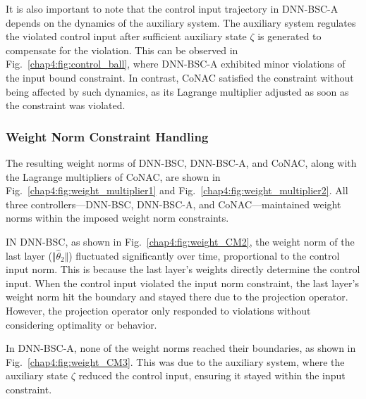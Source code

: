 It is also important to note that the control input trajectory in DNN-BSC-A depends on the dynamics of the auxiliary system. The auxiliary system regulates the violated control input after sufficient auxiliary state $\zeta$ is generated to compensate for the violation. This can be observed in Fig.~\ref{chap4:fig:control_ball}, where DNN-BSC-A exhibited minor violations of the input bound constraint. In contrast, CoNAC satisfied the constraint without being affected by such dynamics, as its Lagrange multiplier adjusted as soon as the constraint was violated.

\subsubsection{Weight Norm Constraint Handling}

The resulting weight norms of DNN-BSC, DNN-BSC-A, and CoNAC, along with the Lagrange multipliers of CoNAC, are shown in Fig.~\ref{chap4:fig:weight_multiplier1} and Fig.~\ref{chap4:fig:weight_multiplier2}. All three controllers—DNN-BSC, DNN-BSC-A, and CoNAC—maintained weight norms within the imposed weight norm constraints.

IN DNN-BSC, as shown in Fig.~\ref{chap4:fig:weight_CM2}, the weight norm of the last layer (\ie $\Vert {{{\hat \theta }_2}} \Vert$) fluctuated significantly over time, proportional to the control input norm. This is because the last layer’s weights directly determine the control input. When the control input violated the input norm constraint, the last layer’s weight norm hit the boundary and stayed there due to the projection operator. However, the projection operator only responded to violations without considering optimality or behavior.

In DNN-BSC-A, none of the weight norms reached their boundaries, as shown in Fig.~\ref{chap4:fig:weight_CM3}. This was due to the auxiliary system, where the auxiliary state $\zeta$ reduced the control input, ensuring it stayed within the input constraint.

